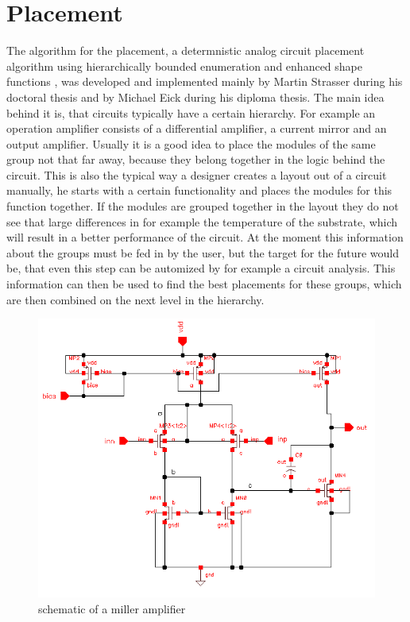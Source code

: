 \chapter{Placement}
The algorithm for the placement, a determnistic analog circuit placement algorithm using hierarchically bounded enumeration and enhanced shape functions \cite{iccad:plantage}, was developed and implemented mainly by Martin Strasser during his doctoral thesis and by Michael Eick during his diploma thesis. The main idea behind it is, that circuits typically have a certain hierarchy. For example an operation amplifier  consists of a differential amplifier, a current mirror and an output amplifier. Usually it is a good idea to place the modules of the same group not that far away, because they belong together in the logic behind the circuit. This is also the typical way a designer creates a layout out of a circuit manually, he starts with a certain functionality and places the modules for this function together. If the modules are grouped together in the layout  they do not see that large differences in for example the temperature of the substrate, which will result in a better performance of the circuit.
At the moment this information about the groups must be fed in by the user, but the target for the future would be, that even this step can be automized by for example a circuit analysis. This information can then be used to find the best placements for these groups, which are then combined on the next level in the hierarchy.

\begin{figure}
	\centering
	\includegraphics[scale=0.6]{FIG/miller_amplifier_schematic.png}
	\caption{schematic of a miller amplifier}
	\label{fig:miller_amplifier_schematic}
\end{figure}


